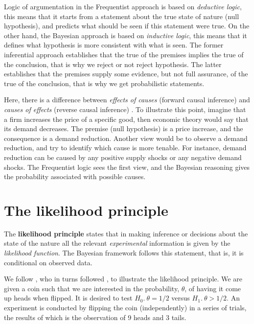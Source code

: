 Logic of argumentation in the Frequentist approach is based on \textit{deductive logic}, this means that it starts from a statement about the true state of nature (null hypothesis), and predicts what should be seen if this statement were true. On the other hand, the Bayesian approach is based on \textit{inductive logic}, this means that it defines what hypothesis is more consistent with what is seen. The former inferential approach establishes that the true of the premises implies the true of the conclusion, that is why we reject or not reject hypothesis. The latter establishes that the premises supply some evidence, but not full assurance, of the true of the conclusion, that is why we get probabilistic statements.

Here, there is a difference between \textit{effects of causes} (forward causal inference) and \textit{causes of effects} (reverse causal inference) \cite{Gelman2013,Dawid2016}. To illustrate this point, imagine that a firm increases the price of a specific good, then economic theory would say that its demand decreases. The premise (null hypothesis) is a price increase, and the consequence is a demand reduction. Another view would be to observe a demand reduction, and try to identify which cause is more tenable. For instance, demand reduction can be caused by any positive supply shocks or any negative demand shocks. The Frequentist logic sees the first view, and the Bayesian reasoning gives the probability associated with possible causes.

\section{The likelihood principle}\label{sec24} 

The \textbf{likelihood principle} states that in making inference or decisions about the state of the nature all the relevant \textit{experimental} information is given by the \textit{likelihood function}. The Bayesian framework follows this statement, that is, it is conditional on observed data.

We follow \cite{berger93}, who in turns followed \cite{Lindley76}, to illustrate the likelihood principle. We are given a coin such that we are interested in the probability, $\theta$, of having it come up heads when flipped. It is desired to test $H_0. \ \theta=1/2$ versus $H_1. \ \theta>1/2$. An experiment is conducted by flipping the coin (independently) in a series of trials, the results of which is the observation of 9 heads and 3 tails.

